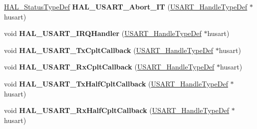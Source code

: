 \begin{DoxyCompactItemize}
\item 
\mbox{\label{group___u_s_a_r_t___exported___functions___group2_gacaa3343ed3decaff634e87f9a30682b7}} 
\hyperlink{stm32f0xx__hal__def_8h_a63c0679d1cb8b8c684fbb0632743478f}{H\+A\+L\+\_\+\+Status\+Type\+Def} {\bfseries H\+A\+L\+\_\+\+U\+S\+A\+R\+T\+\_\+\+Abort\+\_\+\+IT} (\hyperlink{struct_u_s_a_r_t___handle_type_def}{U\+S\+A\+R\+T\+\_\+\+Handle\+Type\+Def} $\ast$husart)
\item 
\mbox{\label{group___u_s_a_r_t___exported___functions___group2_ga4ac0981601603af111c7e59db1680ace}} 
void {\bfseries H\+A\+L\+\_\+\+U\+S\+A\+R\+T\+\_\+\+I\+R\+Q\+Handler} (\hyperlink{struct_u_s_a_r_t___handle_type_def}{U\+S\+A\+R\+T\+\_\+\+Handle\+Type\+Def} $\ast$husart)
\item 
\mbox{\label{group___u_s_a_r_t___exported___functions___group2_ga140f7cd834ae6359fcb4a71e0fe29909}} 
void {\bfseries H\+A\+L\+\_\+\+U\+S\+A\+R\+T\+\_\+\+Tx\+Cplt\+Callback} (\hyperlink{struct_u_s_a_r_t___handle_type_def}{U\+S\+A\+R\+T\+\_\+\+Handle\+Type\+Def} $\ast$husart)
\item 
\mbox{\label{group___u_s_a_r_t___exported___functions___group2_ga5937cf9bb1958b927bf34900d19c9724}} 
void {\bfseries H\+A\+L\+\_\+\+U\+S\+A\+R\+T\+\_\+\+Rx\+Cplt\+Callback} (\hyperlink{struct_u_s_a_r_t___handle_type_def}{U\+S\+A\+R\+T\+\_\+\+Handle\+Type\+Def} $\ast$husart)
\item 
\mbox{\label{group___u_s_a_r_t___exported___functions___group2_ga107416fd537ed66aaaf530581c1a2c0a}} 
void {\bfseries H\+A\+L\+\_\+\+U\+S\+A\+R\+T\+\_\+\+Tx\+Half\+Cplt\+Callback} (\hyperlink{struct_u_s_a_r_t___handle_type_def}{U\+S\+A\+R\+T\+\_\+\+Handle\+Type\+Def} $\ast$husart)
\item 
\mbox{\label{group___u_s_a_r_t___exported___functions___group2_ga2b22726b27e640b3d37a896ef5113b49}} 
void {\bfseries H\+A\+L\+\_\+\+U\+S\+A\+R\+T\+\_\+\+Rx\+Half\+Cplt\+Callback} (\hyperlink{struct_u_s_a_r_t___handle_type_def}{U\+S\+A\+R\+T\+\_\+\+Handle\+Type\+Def} $\ast$husart)

\end{DoxyCompactItemize}
